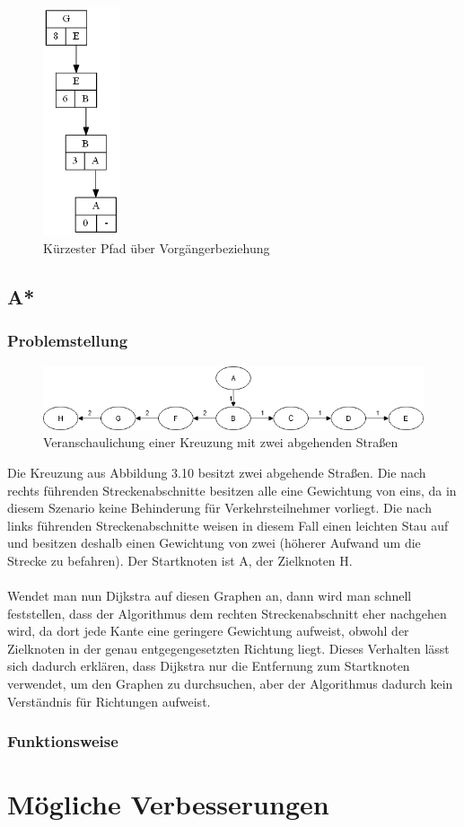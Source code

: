 \documentclass[11pt]{scrreprt}
\begin{document}
			\begin{figure}[ht]
				\centering
				\includegraphics[width=0.2\textwidth]{Graphs/ExamplePath}
				\caption{Kürzester Pfad über Vorgängerbeziehung}
			\end{figure}
			\FloatBarrier
\newpage
\section{A*}
\subsection{Problemstellung}
\begin{figure}[ht]
	\centering
	\includegraphics[width=1\textwidth]{Graphs/ExampleHighway}
	\caption{Veranschaulichung einer Kreuzung mit zwei abgehenden Straßen}
\end{figure}
\FloatBarrier
Die Kreuzung aus Abbildung 3.10 besitzt zwei abgehende Straßen.
Die nach rechts führenden Streckenabschnitte besitzen alle eine Gewichtung von eins, da in diesem Szenario keine Behinderung für Verkehrsteilnehmer vorliegt. 
Die nach links führenden Streckenabschnitte weisen in diesem Fall einen leichten Stau auf und besitzen deshalb einen Gewichtung von zwei (höherer Aufwand um die Strecke zu befahren).
Der Startknoten ist A, der Zielknoten H.
\\\\
Wendet man nun Dijkstra auf diesen Graphen an, dann wird man schnell feststellen, dass der Algorithmus dem rechten Streckenabschnitt eher nachgehen wird, da dort jede Kante eine geringere Gewichtung aufweist, obwohl der Zielknoten in der genau entgegengesetzten Richtung liegt.
Dieses Verhalten lässt sich dadurch erklären, dass Dijkstra nur die Entfernung zum Startknoten verwendet, um den Graphen zu durchsuchen, aber der Algorithmus dadurch kein Verständnis für Richtungen aufweist.

\subsection{Funktionsweise}



\chapter{Mögliche Verbesserungen}
\end{document}
